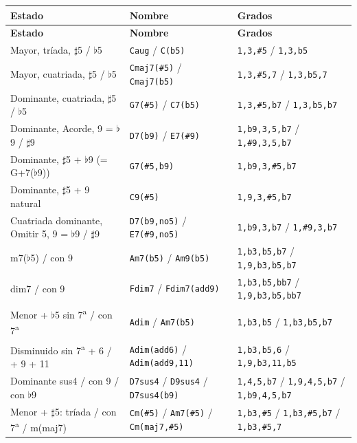 \documentclass[a4paper,11pt,oneside]{report}
\newcommand{\flt}{\ensuremath{\flat}}
\newcommand{\shp}{\ensuremath{\sharp}}
\begin{document}
\begin{center}
\begin{longtable}{L{5.4cm}L{3.9cm}L{5.0cm}}
\toprule
{}\textbf{Estado} & \textbf{Nombre} & \textbf{Grados}\\
\midrule
\endfirsthead
{}\textbf{Estado} & \textbf{Nombre} & \textbf{Grados}\\
\midrule
\endhead
\bottomrule
\endlastfoot
Mayor, tríada, \shp5 / \flt5 & \lstinline!Caug! / \lstinline!C(b5)! & \lstinline!1,3,#5! / \lstinline!1,3,b5!\\
Mayor, cuatriada, \shp5 / \flt5 & \lstinline!Cmaj7(#5)! / \lstinline!Cmaj7(b5)! & \lstinline!1,3,#5,7! / \lstinline!1,3,b5,7!\\
Dominante, cuatriada, \shp5 / \flt5 & \lstinline!G7(#5)! / \lstinline!C7(b5)! & \lstinline!1,3,#5,b7! / \lstinline!1,3,b5,b7!\\
Dominante, Acorde, 9 = \flt9 / \shp9 & \lstinline!D7(b9)! / \lstinline!E7(#9)! & \lstinline!1,b9,3,5,b7! / \lstinline!1,#9,3,5,b7!\\
Dominante, \shp5 + \flt9 (= G+7(\flt9)) & \lstinline!G7(#5,b9)! & \lstinline!1,b9,3,#5,b7!\\
Dominante, \shp5 + 9 natural & \lstinline!C9(#5)! & \lstinline!1,9,3,#5,b7!\\
Cuatriada dominante, Omitir 5, 9 = \flt9 / \shp9 & \lstinline!D7(b9,no5)! / \lstinline!E7(#9,no5)! & \lstinline!1,b9,3,b7! / \lstinline!1,#9,3,b7!\\
m7(\flt5) / con 9 & \lstinline!Am7(b5)! / \lstinline!Am9(b5)! & \lstinline!1,b3,b5,b7! / \lstinline!1,9,b3,b5,b7!\\
dim7 / con 9 & \lstinline!Fdim7! / \lstinline!Fdim7(add9)! & \lstinline!1,b3,b5,bb7! / \lstinline!1,9,b3,b5,bb7!\\
Menor + \flt5 sin 7\textsuperscript{a} / con 7\textsuperscript{a} & \lstinline!Adim! / \lstinline!Am7(b5)! & \lstinline!1,b3,b5! / \lstinline!1,b3,b5,b7!\\
Disminuido sin 7\textsuperscript{a} + 6 / + 9 + 11 & \lstinline!Adim(add6)! / \lstinline!Adim(add9,11)! & \lstinline!1,b3,b5,6! / \lstinline!1,9,b3,11,b5!\\
Dominante sus4 / con 9 / con \flt9 & \lstinline!D7sus4! / \lstinline!D9sus4! / \lstinline!D7sus4(b9)! & \lstinline!1,4,5,b7! / \lstinline!1,9,4,5,b7! / \lstinline!1,b9,4,5,b7!\\
Menor + \shp5: tríada / con 7\textsuperscript{a} / m(maj7) & \lstinline!Cm(#5)! / \lstinline!Am7(#5)! / \lstinline!Cm(maj7,#5)! & \lstinline!1,b3,#5! / \lstinline!1,b3,#5,b7! / \lstinline!1,b3,#5,7!\\

\end{longtable}
\end{center}
\end{document}
